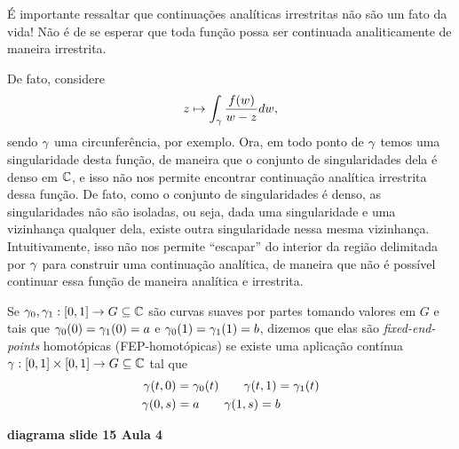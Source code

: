     \begin{observacao}
        É importante ressaltar que continuações analíticas irrestritas não são um fato da vida!
        Não é de se esperar que toda função possa ser continuada analiticamente de maneira
        irrestrita.
        
        De fato, considere
        \begin{equation*}
            z\mapsto \int_{\gamma} \frac{f(w)}{w-z}dw,
        \end{equation*}
        sendo $\gamma$ uma circunferência, por exemplo. Ora, em todo ponto de $\gamma$
        temos uma singularidade desta função, de maneira que o conjunto de singularidades
        dela é denso em $\mathbb{C}$, e isso não nos permite encontrar continuação analítica 
        irrestrita dessa função. De fato, como o conjunto de singularidades é denso, as 
        singularidades não são isoladas, ou seja, dada uma singularidade e uma vizinhança
        qualquer dela, existe outra singularidade nessa mesma vizinhança. Intuitivamente, 
        isso não nos permite ``escapar'' do interior da região delimitada por $\gamma$ para
        construir uma continuação analítica, de maneira que não é possível continuar 
        essa função de maneira analítica e irrestrita.
    \end{observacao}

    \begin{definicao}
    \label{def-fep-homotopicas}
        Se $\gamma_0, \gamma_1 :[0,1]\to G\subseteq\mathbb{C}$ são curvas 
        suaves por partes tomando valores em $G$ e tais que 
        $\gamma_0(0) = \gamma_1(0) = a$ e $\gamma_0(1) = \gamma_1(1) = b$, 
        dizemos que elas são \textit{fixed-end-points}
        homotópicas (FEP-homotópicas) se existe uma aplicação contínua 
        $\gamma:[0,1]\times [0,1] \to G\subseteq\mathbb{C}$ tal que
        \begin{align*}
            \gamma(t,0) &= \gamma_0(t) \qquad \gamma(t,1) = \gamma_1(t) \\
            \gamma(0,s) &= a \qquad \gamma(1,s) = b
        \end{align*}
        \begin{center}
            \textbf{diagrama slide 15 Aula 4}
        \end{center}
    \end{definicao}


